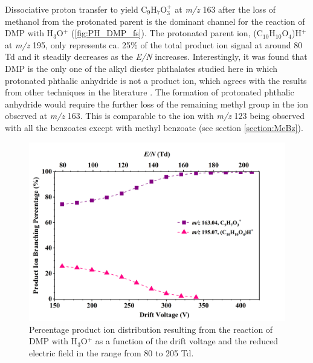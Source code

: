Dissociative proton transfer to yield C$_9$H$_{7}$O$_3^+$ at \textit{m/z} 163 after the loss of methanol from the protonated parent 
is the dominant channel for the reaction of DMP with H$_3$O$^+$ (\autoref{fig:PH_DMP_fs}).
The protonated parent ion, (C$_{10}$H$_{10}$O$_4$)H$^+$ at \textit{m/z} 195, only represents ca. 25\% of the total product ion signal at around 80 Td and it steadily decreases as the \textit{E/N} increases.
%
Interestingly, it was found that DMP is the only one of the alkyl diester phthalates studied here in which protonated phthalic anhydride is not a product ion, which agrees with the results from other techniques in the literature \cite{yin2014mass}.
%
The formation of protonated phthalic anhydride would require the further loss of the remaining methyl group in the ion observed at \textit{m/z} 163.
%
This is comparable to the ion with \textit{m/z} 123 being observed with all the benzoates except with methyl benzoate (see section \ref{section:MeBz}). 



\begin{figure}[htb]%
\centering
\includegraphics[height=0.4\textheight]{pics/DMP-BR.png}
\caption{Percentage product ion distribution resulting from the reaction of DMP with H$_3$O$^+$ as a function of the drift voltage and the reduced electric field in the range from 80 to 205 Td.}
\label{fig:PH_DMP_fs}
\end{figure}




